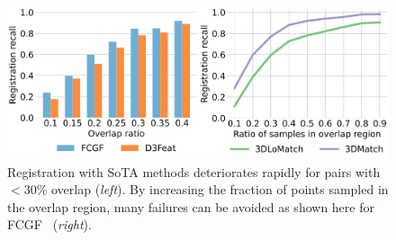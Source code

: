 \begin{figure}[t]
    \centering
    \includegraphics[width=0.8\columnwidth]{figures/images/motivation.jpg}
    \caption{Registration with SoTA methods deteriorates rapidly for pairs with $<$30\% overlap (\textit{left}). By increasing the fraction of points sampled in the overlap region, many failures can be avoided as shown here for FCGF~\cite{Choy2019FCGF} (\textit{right}).} 
    \label{fig:motivation}
    
\end{figure}